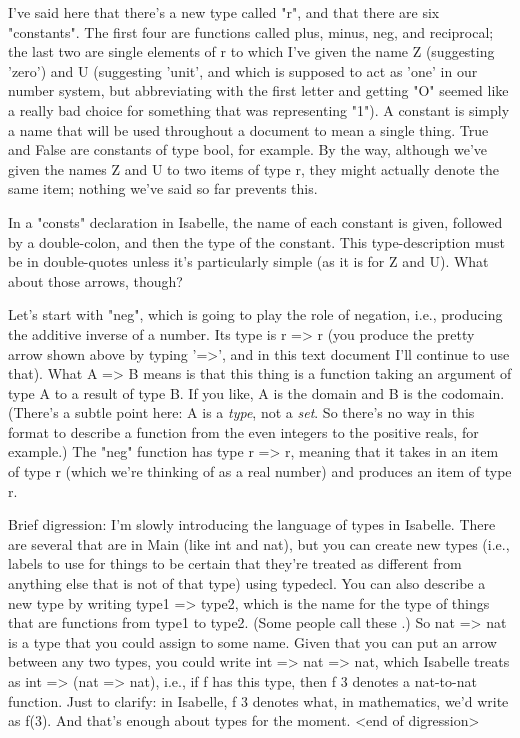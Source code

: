 I've said here that there's a new type called "r", and that there are six "constants". The first four are functions called plus, minus, neg, and reciprocal; the last two are single elements of r to which I've given the name Z (suggesting 'zero') and U (suggesting 'unit', and which is supposed to act as 'one' in our number system, but abbreviating with the first letter and getting "O" seemed like a really bad choice for something that was representing "1"). A constant is simply a name that will be used throughout a document to mean a single thing. True and False are constants of type bool, for example. By the way, although we've given the names Z and U to two items of type r, they might actually denote the same item; nothing we've said so far prevents this.

In a "consts" declaration in Isabelle, the name of each constant is given, followed by a double-colon, and then the type of the constant. This type-description must be in double-quotes unless it's particularly simple (as it is for Z and U). What about those arrows, though? 

Let's start with "neg", which is going to play the role of negation, i.e., producing the additive inverse of a number. Its type is r => r  (you produce the pretty arrow shown above by typing '=>', and in this text document I'll continue to use that). What A => B means is that this thing is a function taking an argument of type A to a result of type B. If you like, A is the domain and B is the codomain. (There's a subtle point here: A is a \textit{type}, not a \textit{set}. So there's no way in this format to describe a function from the even integers to the positive reals, for example.) The "neg" function has type r => r, meaning that it takes in an item of type r (which we're thinking of as a real number) and produces an item of type r.

Brief digression: I'm slowly introducing the language of types in Isabelle. There are several that are in Main (like int and nat), but you can create new types (i.e., labels to use for things to be certain that they're treated as different from anything else that is not of that type) using typedecl. You can also describe a new type by writing type1 => type2, which is the name for the type of things that are functions from type1 to type2. (Some people call these .) So nat => nat is a type that you could assign to some name. Given that you can put an arrow between any two types, you could write int => nat => nat, which Isabelle treats as int => (nat => nat), i.e., if f has this type, then f 3 denotes a nat-to-nat function. Just to clarify: in Isabelle, f 3 denotes what, in mathematics, we'd write as f(3). And that's enough about types for the moment. <end of digression> 

